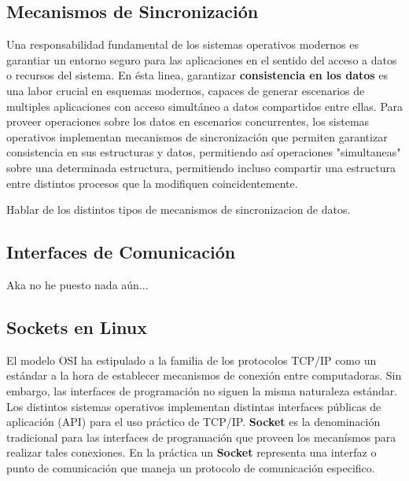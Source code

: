 \subsection{Mecanismos de Sincronización}
Una responsabilidad fundamental de los sistemas operativos modernos es garantiar un entorno seguro para las aplicaciones en el sentido del acceso a datos o recursos del sistema. En ésta linea, garantizar \textbf{consistencia en los datos} es una labor crucial en esquemas modernos, capaces de generar escenarios de multiples aplicaciones con acceso simultáneo a datos compartidos entre ellas. Para proveer operaciones sobre los datos en escenarios concurrentes, los sistemas operativos implementan mecanismos de sincronización que permiten garantizar consistencia en sus estructuras y datos, permitiendo así operaciones "simultaneas" sobre una determinada estructura, permitiendo incluso compartir una estructura entre distintos procesos que la modifiquen coincidentemente.

Hablar de los distintos tipos de mecanismos de sincronizacion de datos.

\subsection{Interfaces de Comunicación}

Aka no he puesto nada aún...

\subsection{Sockets en Linux}
El modelo OSI ha estipulado a la familia de los protocolos TCP/IP como un estándar a la hora de establecer mecanismos de conexión entre computadoras. Sin embargo, las interfaces de programación no siguen la misma naturaleza estándar. Los distintos sistemas operativos implementan distintas interfaces públicas de aplicación (API) para el uso práctico de TCP/IP. \textbf{Socket} es la denominación tradicional para las interfaces de programación que proveen los mecanísmos para realizar tales conexiones. En la práctica un \textbf{Socket} representa una interfaz o punto de comunicación que maneja un protocolo de comunicación especifico.


